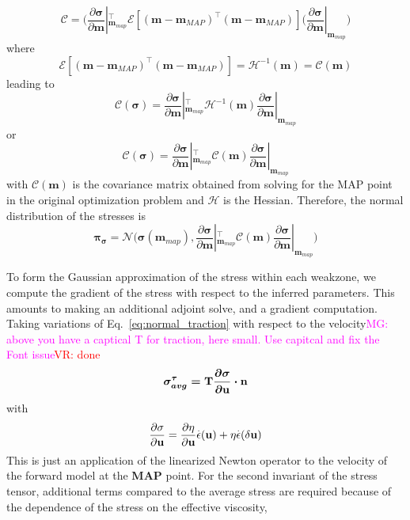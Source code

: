 \documentclass[12pt]{article}
\newcommand{\mgnote}[1]{\textcolor{magenta}{MG: #1}}
\newcommand{\vrnote}[1]{\textcolor{red}{VR: #1}}
\newcommand{\mm}{{\ensuremath{\boldsymbol{m}}}}
\newcommand{\ppi}{{\ensuremath{\boldsymbol{\pi}}}}
\newcommand{\ssigma}{{\ensuremath{\boldsymbol{\sigma}}}}
\begin{document}
{\begin{equation}
\mathcal C = \big(\frac{\partial\ssigma}{\partial \mm}|_{\mm_{map}}^\intercal \mathcal E[(\mm-\mm_{MAP})^\intercal(\mm-\mm_{MAP})](\frac{\partial\ssigma}{\partial \mm}|_{\mm_{map}}\big)
\end{equation}
where 
\begin{equation}
  \mathcal E[(\mm-\mm_{MAP})^\intercal(\mm-\mm_{MAP})] = \mathcal H^{-1}(\mm) = \mathcal C(\mm)
  \end{equation}
leading to
\begin{equation}
\mathcal C(\ssigma) = \frac{\partial\ssigma}{\partial \mm}|_{\mm_{map}}^\intercal \mathcal H^{-1}(\mm)\frac{\partial\ssigma}{\partial \mm}|_{\mm_{map}}
\end{equation}
or 
\begin{equation}
\mathcal C(\ssigma) = \frac{\partial\ssigma}{\partial \mm}|_{\mm_{map}}^\intercal \mathcal C(\mm)\frac{\partial\ssigma}{\partial \mm}|_{\mm_{map}}
\end{equation}
with $\mathcal C(\mm)$ is the covariance matrix obtained from solving for the MAP point in the original optimization problem
and $\mathcal H$ is the Hessian.
Therefore, the normal distribution of the stresses is
\begin{equation}
  \ppi_{\ssigma} = \mathcal N\big(\ssigma(\mm_{map}), \frac{\partial\ssigma}{\partial \mm}|_{\mm_{map}}^\intercal \mathcal C(\mm)\frac{\partial\ssigma}{\partial \mm}|_{\mm_{map}}\big)
\end{equation}

To form the Gaussian approximation of the stress within each weakzone, we compute the gradient of the stress with respect to the inferred parameters. This amounts to making an additional adjoint solve, and a gradient computation. Taking variations of Eq.~\eqref{eq:normal_traction} with respect to the velocity\mgnote{above you have a captical T for traction, here small. Use capitcal and fix the Font issue}\vrnote{done}
\begin{equation}
\sigma^{\tau}_{avg}=\boldmath{\mathrm{T}}\frac{\partial\sigma}{\partial \textbf u}\cdot \textbf n
\end{equation}
with
\begin{equation}
\frac{\partial\sigma}{\partial \textbf u} = \frac{\partial \eta}{\partial \textbf u}\overset{.}{\epsilon}(\textbf u)
                                            + \eta\overset{.}{\epsilon}(\delta \textbf u)
\end{equation}
This is just an application of the linearized Newton operator to the velocity of the forward model at the \textbf{MAP} point.
For the second invariant of the stress tensor, additional terms compared to the average stress are required because of the dependence of the stress on the effective viscosity,

}
\end{document}
